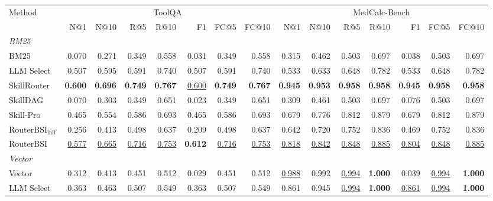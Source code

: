 \begin{table}[t]
\centering
\footnotesize
\setlength{\tabcolsep}{2pt}
\begin{tabular*}{\textwidth}{@{\extracolsep{\fill}}lrrrrrrrrrrrrrr@{}}
\toprule
Method & \multicolumn{7}{c}{ToolQA} & \multicolumn{7}{c}{MedCalc-Bench} \\
\cmidrule(lr){2-8}\cmidrule(lr){9-15}
 & N@1 & N@10 & R@5 & R@10 & F1 & FC@5 & FC@10 & N@1 & N@10 & R@5 & R@10 & F1 & FC@5 & FC@10 \\
\midrule
\multicolumn{15}{l}{\textit{BM25}} \\
\midrule
BM25 & 0.070 & 0.271 & 0.349 & 0.558 & 0.031 & 0.349 & 0.558 & 0.315 & 0.462 & 0.503 & 0.697 & 0.038 & 0.503 & 0.697 \\
LLM Select & 0.507 & 0.595 & 0.591 & 0.740 & 0.507 & 0.591 & 0.740 & 0.533 & 0.633 & 0.648 & 0.782 & 0.533 & 0.648 & 0.782 \\
SkillRouter & \textbf{0.600} & \textbf{0.696} & \textbf{0.749} & \textbf{0.767} & \underline{0.600} & \textbf{0.749} & \textbf{0.767} & \textbf{0.945} & \textbf{0.953} & \textbf{0.958} & \textbf{0.958} & \textbf{0.945} & \textbf{0.958} & \textbf{0.958} \\
SkillDAG & 0.070 & 0.303 & 0.349 & 0.651 & 0.023 & 0.349 & 0.651 & 0.309 & 0.461 & 0.503 & 0.697 & 0.076 & 0.503 & 0.697 \\
Skill-Pro & 0.465 & 0.554 & 0.586 & 0.693 & 0.465 & 0.586 & 0.693 & 0.679 & 0.776 & 0.812 & 0.879 & 0.679 & 0.812 & 0.879 \\
$\mathrm{RouterBSI}_{\mathrm{init}}$ & 0.256 & 0.413 & 0.498 & 0.637 & 0.209 & 0.498 & 0.637 & 0.642 & 0.720 & 0.752 & 0.836 & 0.469 & 0.752 & 0.836 \\
RouterBSI & \underline{0.577} & \underline{0.665} & \underline{0.716} & \underline{0.753} & \textbf{0.612} & \underline{0.716} & \underline{0.753} & \underline{0.818} & \underline{0.842} & \underline{0.848} & \underline{0.885} & \underline{0.804} & \underline{0.848} & \underline{0.885} \\
\midrule
\multicolumn{15}{l}{\textit{Vector}} \\
\midrule
Vector & 0.312 & 0.413 & 0.451 & 0.512 & 0.029 & 0.451 & 0.512 & \underline{0.988} & 0.992 & \underline{0.994} & \textbf{1.000} & 0.039 & \underline{0.994} & \textbf{1.000} \\
LLM Select & 0.363 & 0.463 & 0.507 & 0.549 & 0.363 & 0.507 & 0.549 & 0.861 & 0.945 & \underline{0.994} & \textbf{1.000} & \underline{0.861} & \underline{0.994} & \textbf{1.000} \\

\end{tabular*}
\end{table}
